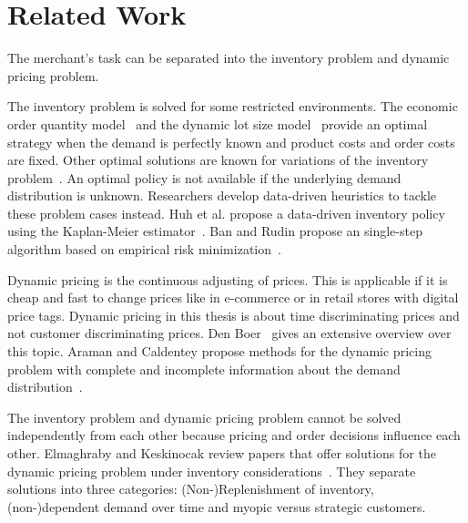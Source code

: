
\chapter{Related Work}

The merchant's task can be separated into the inventory problem and dynamic pricing problem.

The inventory problem is solved for some restricted environments.
The economic order quantity model~\cite{harris1913many} and the dynamic lot size model~\cite{wagner1958dynamic} provide an optimal strategy when the demand is perfectly known and product costs and order costs are fixed.
Other optimal solutions are known for variations of the inventory problem~\cite{scarf1963survey, arrow1958studies}.
An optimal policy is not available if the underlying demand distribution is unknown.
Researchers develop data-driven heuristics to tackle these problem cases instead.
Huh et al. propose a data-driven inventory policy using the Kaplan-Meier estimator~\cite{huh2011adaptive}.
Ban and Rudin propose an single-step algorithm based on empirical risk minimization~\cite{ban2017big}.

Dynamic pricing is the continuous adjusting of prices.
This is applicable if it is cheap and fast to change prices like in e-commerce or in retail stores with digital price tags. %
Dynamic pricing in this thesis is about time discriminating prices and not customer discriminating prices. %
Den Boer~\cite{den2015dynamic} gives an extensive overview over this topic.
Araman and Caldentey propose methods for the dynamic pricing problem with complete and incomplete information about the demand distribution~\cite{araman2011revenue}.
~\cite{DBLP:journals/ijecommerce/KannanK01} %


The inventory problem and dynamic pricing problem cannot be solved independently from each other because pricing and order decisions influence each other.
Elmaghraby and Keskinocak review papers that offer solutions for the dynamic pricing problem under inventory considerations~\cite{elmaghraby2003dynamic}.
They separate solutions into three categories:
(Non-)Replenishment of inventory, (non-)dependent demand over time and myopic versus strategic customers.

